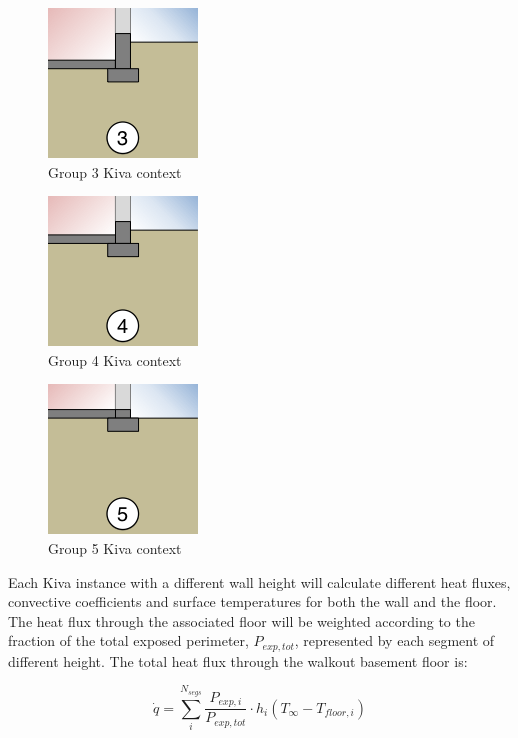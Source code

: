 \begin{figure}
\centering
\includegraphics{media/kiva-walkout-2d-3.png}
\caption{Group 3 Kiva context\label{fig:wo-3}}
\end{figure}

\begin{figure}
\centering
\includegraphics{media/kiva-walkout-2d-4.png}
\caption{Group 4 Kiva context\label{fig:wo-4}}
\end{figure}

\begin{figure}
\centering
\includegraphics{media/kiva-walkout-2d-5.png}
\caption{Group 5 Kiva context\label{fig:wo-5}}
\end{figure}

Each Kiva instance with a different wall height will calculate different
heat fluxes, convective coefficients and surface temperatures for both
the wall and the floor. The heat flux through the associated floor will
be weighted according to the fraction of the total exposed perimeter,
\(P_{exp,tot}\), represented by each segment of different height. The
total heat flux through the walkout basement floor is:

\[\dot{q} = \sum^{N_{segs}}_i{\frac{P_{exp,i}}{P_{exp,tot}}}\cdot h_i \left(T_\infty - T_{floor,i} \right)\]

